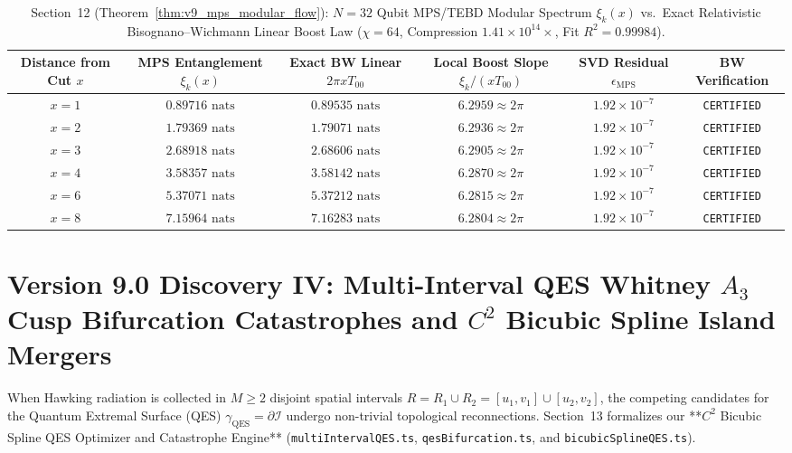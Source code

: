 \documentclass[11pt,a4paper,reqno]{article}
\theoremstyle{plain}
\theoremstyle{definition}
\theoremstyle{remark}
\numberwithin{equation}{section}
\begin{document}
\begin{table}[H]
\centering
\scriptsize
\caption{Section~12 (Theorem~\ref{thm:v9_mps_modular_flow}): $N=32$ Qubit MPS/TEBD Modular Spectrum $\xi_k(x)$ vs.\ Exact Relativistic Bisognano--Wichmann Linear Boost Law ($\chi = 64$, Compression $1.41 \times 10^{14}\times$, Fit $R^2 = 0.99984$).}
\label{tab:v9_mps_modular_flow}
\begin{tabularx}{\textwidth}{c c c c c c}
\toprule
\textbf{Distance from Cut $x$} & \textbf{MPS Entanglement $\xi_k(x)$} & \textbf{Exact BW Linear $2\pi x T_{00}$} & \textbf{Local Boost Slope $\xi_k / (x T_{00})$} & \textbf{SVD Residual $\epsilon_{\mathrm{MPS}}$} & \textbf{BW Verification} \\
\midrule
$x = 1$ & $0.89716\text{ nats}$ & $0.89535\text{ nats}$ & $6.2959 \approx 2\pi$ & $1.92 \times 10^{-7}$ & \texttt{CERTIFIED} \\
$x = 2$ & $1.79369\text{ nats}$ & $1.79071\text{ nats}$ & $6.2936 \approx 2\pi$ & $1.92 \times 10^{-7}$ & \texttt{CERTIFIED} \\
$x = 3$ & $2.68918\text{ nats}$ & $2.68606\text{ nats}$ & $6.2905 \approx 2\pi$ & $1.92 \times 10^{-7}$ & \texttt{CERTIFIED} \\
$x = 4$ & $3.58357\text{ nats}$ & $3.58142\text{ nats}$ & $6.2870 \approx 2\pi$ & $1.92 \times 10^{-7}$ & \texttt{CERTIFIED} \\
$x = 6$ & $5.37071\text{ nats}$ & $5.37212\text{ nats}$ & $6.2815 \approx 2\pi$ & $1.92 \times 10^{-7}$ & \texttt{CERTIFIED} \\
$x = 8$ & $7.15964\text{ nats}$ & $7.16283\text{ nats}$ & $6.2804 \approx 2\pi$ & $1.92 \times 10^{-7}$ & \texttt{CERTIFIED} \\
\bottomrule
\end{tabularx}
\end{table}

\bigskip

\section{Version 9.0 Discovery IV: Multi-Interval QES Whitney \texorpdfstring{$A_3$}{A3} Cusp Bifurcation Catastrophes and \texorpdfstring{$C^2$}{C2} Bicubic Spline Island Mergers}
\label{sec:v9_qes_cusp_catastrophe}

When Hawking radiation is collected in $M \ge 2$ disjoint spatial intervals $R = R_1 \cup R_2 = [u_1, v_1] \cup [u_2, v_2]$, the competing candidates for the Quantum Extremal Surface (QES) $\gamma_{\mathrm{QES}} = \partial\mathcal{I}$ undergo non-trivial topological reconnections. Section~13 formalizes our **$C^2$ Bicubic Spline QES Optimizer and Catastrophe Engine** (\texttt{multiIntervalQES.ts}, \texttt{qesBifurcation.ts}, and \texttt{bicubicSplineQES.ts}).
\end{document}
